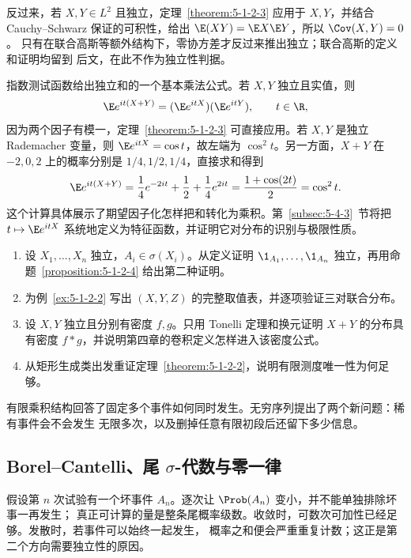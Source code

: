 反过来，若 $X,Y\in L^2$ 且独立，定理~\ref{theorem:5-1-2-3} 应用于 $X,Y$，并结合
Cauchy--Schwarz 保证的可积性，给出 $\E(XY)=\E X\E Y$，所以 $\Cov(X,Y)=0$。
只有在联合高斯等额外结构下，零协方差才反过来推出独立；联合高斯的定义和证明均留到
后文，在此不作为独立性判据。

\begin{remark}[独立和的振荡指数]\label{rem:5-1-2-cf-preview}
指数测试函数给出独立和的一个基本乘法公式。若 $X,Y$ 独立且实值，则
\[
 \E e^{it(X+Y)}=(\E e^{itX})(\E e^{itY}),\qquad t\in\R,
\]
因为两个因子有模一，定理~\ref{theorem:5-1-2-3} 可直接应用。若 $X,Y$ 是独立 Rademacher
变量，则 $\E e^{itX}=\cos t$，故左端为 $\cos^2t$。另一方面，$X+Y$ 在
$-2,0,2$ 上的概率分别是 $1/4,1/2,1/4$，直接求和得到
\[
 \E e^{it(X+Y)}=\frac14e^{-2it}+\frac12+\frac14e^{2it}
 =\frac{1+\cos(2t)}2=\cos^2t.
\]
这个计算具体展示了期望因子化怎样把和转化为乘积。第~\ref{subsec:5-4-3}~节将把
$t\mapsto\E e^{itX}$ 系统地定义为特征函数，并证明它对分布的识别与极限性质。
\end{remark}

\begin{exercise}
\begin{enumerate}
  \item 设 $X_1,\ldots,X_n$ 独立，$A_i\in\sigma(X_i)$。从定义证明
  $\1_{A_1},\ldots,\1_{A_n}$ 独立，再用命题~\ref{proposition:5-1-2-4} 给出第二种证明。
  \item 为例~\ref{ex:5-1-2-2} 写出 $(X,Y,Z)$ 的完整取值表，并逐项验证三对联合分布。
  \item 设 $X,Y$ 独立且分别有密度 $f,g$。只用 Tonelli 定理和换元证明
  $X+Y$ 的分布具有密度 $f*g$，并说明第四章的卷积定义怎样进入该密度公式。
  \item 从矩形生成类出发重证定理~\ref{theorem:5-1-2-2}，说明有限测度唯一性为何足够。
\end{enumerate}
\end{exercise}

有限乘积结构回答了固定多个事件如何同时发生。无穷序列提出了两个新问题：稀有事件会不会发生
无限多次，以及删掉任意有限初段后还留下多少信息。


\subsection{Borel--Cantelli、尾 \texorpdfstring{$\sigma$}{sigma}-代数与零一律}\label{subsec:5-1-3}

假设第 $n$ 次试验有一个坏事件 $A_n$。逐次让 $\Prob(A_n)$ 变小，并不能单独排除坏事一再发生；
真正可计算的量是整条尾概率级数。收敛时，可数次可加性已经足够。发散时，若事件可以始终一起发生，
概率之和便会严重重复计数；这正是第二个方向需要独立性的原因。

